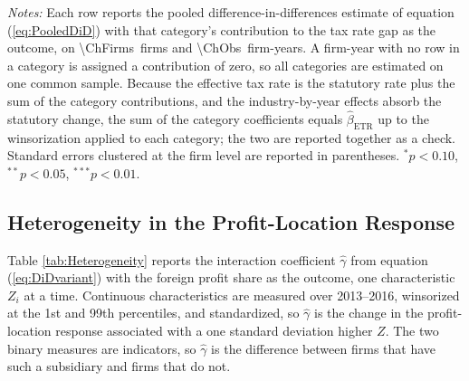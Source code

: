 \documentclass[11pt,letterpaper]{article}
\newcommand{\CountNum}[1]{\num[round-mode=places,round-precision=0]{#1}}
\begin{document}
\begin{table}[!tp]
\begin{threeparttable}
\bigskip
\begin{tablenotes}[flushleft]
\item[] \footnotesize{\textit{Notes:} Each row reports the pooled difference-in-differences
estimate of equation (\ref{eq:PooledDiD}) with that category's contribution to the tax rate gap
as the outcome, on \CountNum{\ChFirms}\ firms and \CountNum{\ChObs}\ firm-years.  A firm-year
with no row in a category is assigned a contribution of zero, so all categories are estimated on one
common sample.  Because the effective tax rate is the statutory rate plus the sum of the category
contributions, and the industry-by-year effects absorb the statutory change, the sum of the
category coefficients equals $\hat\beta_{\text{ETR}}$ up to the winsorization applied to each
category; the two are reported together as a check.  Standard errors clustered at the firm level
are reported in parentheses. $^{*} p<0.10$, $^{**} p<0.05$, $^{***} p<0.01$.}
\end{tablenotes}
\end{threeparttable}

\bigskip
\bigskip
\end{table}

\subsection{Heterogeneity in the Profit-Location Response\label{app:heterogeneity}}

Table \ref{tab:Heterogeneity} reports the interaction coefficient $\hat\gamma$
from equation (\ref{eq:DiDvariant}) with the foreign profit share as the
outcome, one characteristic $Z_i$ at a time. Continuous characteristics are
measured over 2013--2016, winsorized at the 1st and 99th percentiles, and
standardized, so $\hat\gamma$ is the change in the profit-location response
associated with a one standard deviation higher $Z$. The two binary measures
are indicators, so $\hat\gamma$ is the difference between firms that have such
a subsidiary and firms that do not.
\end{document}
